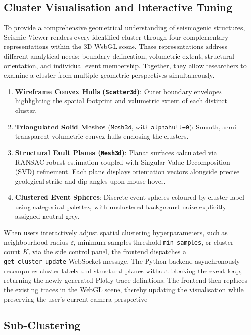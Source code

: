 \subsection{Cluster Visualisation and Interactive Tuning}

To provide a comprehensive geometrical understanding of seismogenic structures, Seismic Viewer renders every identified cluster through four complementary representations within the 3D WebGL scene. These representations address different analytical needs: boundary delineation, volumetric extent, structural orientation, and individual event membership. Together, they allow researchers to examine a cluster from multiple geometric perspectives simultaneously.
\begin{enumerate}
    \item \textbf{Wireframe Convex Hulls (\texttt{Scatter3d})}: Outer boundary envelopes highlighting the spatial footprint and volumetric extent of each distinct cluster.
    \item \textbf{Triangulated Solid Meshes} (\texttt{Mesh3d}, with \texttt{alphahull=0}): Smooth, semi-transparent volumetric convex hulls enclosing the clusters.
    \item \textbf{Structural Fault Planes (\texttt{Mesh3d})}: Planar surfaces calculated via RANSAC robust estimation coupled with Singular Value Decomposition (SVD) refinement. Each plane displays orientation vectors alongside precise geological strike and dip angles upon mouse hover.
    \item \textbf{Clustered Event Spheres}: Discrete event spheres coloured by cluster label using categorical palettes, with unclustered background noise explicitly assigned neutral grey.
\end{enumerate}
When users interactively adjust spatial clustering hyperparameters, such as neighbourhood radius $\varepsilon$, minimum samples threshold \texttt{min\_samples}, or cluster count $K$, via the side control panel, the frontend dispatches a \texttt{get\_cluster\_update} WebSocket message. The Python backend asynchronously recomputes cluster labels and structural planes without blocking the event loop, returning the newly generated Plotly trace definitions. The frontend then replaces the existing traces in the WebGL scene, thereby updating the visualisation while preserving the user's current camera perspective.

\subsection{Sub-Clustering}
\label{sec:sub-clustering}

